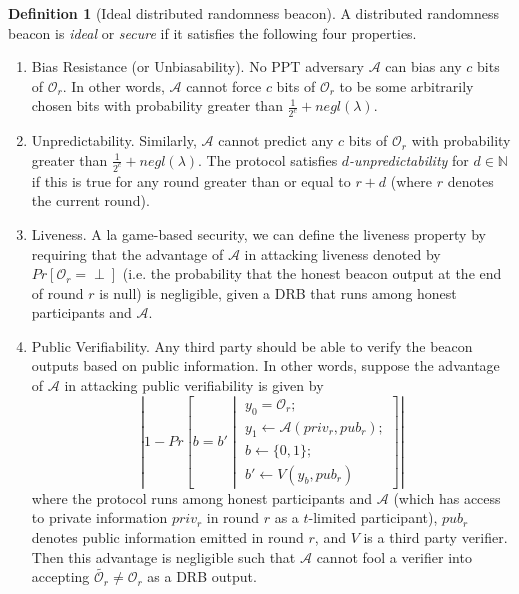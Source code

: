 \documentclass[letterpaper,twocolumn,10pt]{article}
\theoremstyle{definition}
\newtheorem{definition}[theorem]{Definition}
\theoremstyle{remark}
\begin{document}
\begin{definition}[Ideal distributed randomness beacon]
A distributed randomness beacon is \textit{ideal} or \textit{secure} if it satisfies the following four properties.
\begin{enumerate}
\item Bias Resistance (or Unbiasability). No PPT adversary $\mathcal{A}$ can bias any $c$ bits of $\mathcal{O}_r$. In other words, $\mathcal{A}$ cannot force $c$ bits of $\mathcal{O}_r$ to be some arbitrarily chosen bits with probability greater than $\frac{1}{2^c} + negl(\lambda)$.
\item Unpredictability. Similarly, $\mathcal{A}$ cannot predict any $c$ bits of $\mathcal{O}_r$ with probability greater than $\frac{1}{2^c} + negl(\lambda)$. The protocol satisfies \textit{$d$-unpredictability} \cite{bhat2020randpiper} for $d \in \mathbb{N}$ if this is true for any round greater than or equal to $r + d$ (where $r$ denotes the current round).
\item Liveness. A la game-based security, we can define the liveness property \cite{guo2020secRand} by requiring that the advantage of $\mathcal{A}$ in attacking liveness denoted by $Pr[\mathcal{O}_r = \text{$\perp$}]$ (i.e. the probability that the honest beacon output at the end of round $r$ is null) is negligible, given a DRB that runs among honest participants and $\mathcal{A}$.
\item Public Verifiability. Any third party should be able to verify the beacon outputs based on public information. In other words, suppose the advantage of $\mathcal{A}$ in attacking public verifiability is given by
\[
\left\lvert 1 - Pr\left[b = b' \middle\vert \begin{array}{l}
y_0 = \mathcal{O}_r;\\
y_1 \leftarrow \mathcal{A}(priv_r, pub_r);\\
b \leftarrow \{0, 1\};\\
b' \leftarrow V(y_b, pub_r)
\end{array}\right]
\right\rvert
\]
where the protocol runs among honest participants and $\mathcal{A}$ (which has access to private information $priv_r$ in round $r$ as a $t$-limited participant), $pub_r$ denotes public information emitted in round $r$, and $V$ is a third party verifier. Then this advantage is negligible such that $\mathcal{A}$ cannot fool a verifier into accepting $\tilde{\mathcal{O}_r} \neq \mathcal{O}_r$ as a DRB output.
\end{enumerate}
\end{definition}
\end{document}

